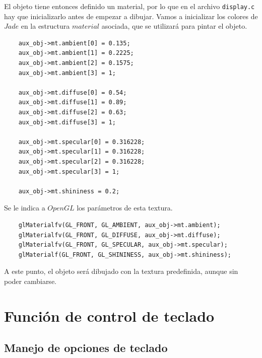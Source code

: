 \documentclass[12pt,a4paper]{article}
\begin{document}
El objeto tiene entonces definido un material, por lo que en el archivo \texttt{display.c} hay que inicializarlo antes de empezar a dibujar. Vamos a inicializar los colores de $Jade$ en la estructura $material$ asociada, que se utilizará para pintar el objeto.

\begin{lstlisting}
	aux_obj->mt.ambient[0] = 0.135;
	aux_obj->mt.ambient[1] = 0.2225;
	aux_obj->mt.ambient[2] = 0.1575;
	aux_obj->mt.ambient[3] = 1;

	aux_obj->mt.diffuse[0] = 0.54;
	aux_obj->mt.diffuse[1] = 0.89;
	aux_obj->mt.diffuse[2] = 0.63;
	aux_obj->mt.diffuse[3] = 1;

	aux_obj->mt.specular[0] = 0.316228;
	aux_obj->mt.specular[1] = 0.316228;
	aux_obj->mt.specular[2] = 0.316228;
	aux_obj->mt.specular[3] = 1;

	aux_obj->mt.shininess = 0.2;
\end{lstlisting}

Se le indica a $OpenGL$ los parámetros de esta textura.

\begin{lstlisting}
	glMaterialfv(GL_FRONT, GL_AMBIENT, aux_obj->mt.ambient);
	glMaterialfv(GL_FRONT, GL_DIFFUSE, aux_obj->mt.diffuse);
	glMaterialfv(GL_FRONT, GL_SPECULAR, aux_obj->mt.specular);
	glMaterialf(GL_FRONT, GL_SHININESS, aux_obj->mt.shininess);
\end{lstlisting}

A este punto, el objeto será dibujado con la textura predefinida, aunque sin poder cambiarse.

\newpage

\section{Función de control de teclado}

\subsection{Manejo de opciones de teclado}
\end{document}
